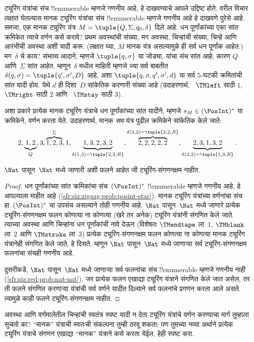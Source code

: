 \documentclass[../../../include/open-logic-section]{subfiles}
\begin{document}
\begin{explain}
ट्यूरिंग यंत्रांचा संच !!{enumerable} म्हणजे गणनीय
आहे, हे दाखवण्याचे आपले उद्दिष्ट होते. वरील विचार
लक्षात घेतल्यास मानक ट्यूरिंग यंत्रांचा संच
!!{enumerable} म्हणजे गणनीय
आहे हे दाखवणे पुरेसे आहे. समजा, एक मानक ट्यूरिंग
यंत्र $M = \tuple{Q, \Sigma, q_0, \delta}$ दिले
आहे. धन पूर्णांकांच्या एका सांत क्रमिकेत त्याचे
वर्णन कसे करावे? प्रथम अवस्थांची संख्या, मग
अवस्था, चिन्हांची संख्या, चिन्हे आणि आरंभीची
अवस्था अशी यादी करू. (लक्षात घ्या, $M$ मानक
यंत्र असल्यामुळे ही सर्व धन पूर्णांक आहेत.)
मग~$\delta$ चे काय? संभाव्य आदाने, म्हणजे
$\tuple{q,\sigma}$ या जोड्या, यांचा संच सांत आहे;
कारण $Q$ आणि~$\Sigma$ सांत आहेत. म्हणून~$\delta$
मधील माहिती म्हणजे ज्या सर्व बाबतीत
$\delta(q,\sigma) = \tuple{q', \sigma', D}$ आहे,
अशा $\tuple{q, \sigma, q', \sigma', d}$
या सर्व $5$-घटकी क्रमितांची सांत यादी होय.
येथे $d$ ही दिशा~$D$ सांकेतिक
करणारी संख्या आहे (उदाहरणार्थ,
~$\TMleft$ साठी $1$, ~$\TMright$ साठी $2$
आणि ~$\TMstay$ साठी $3$).

अशा प्रकारे प्रत्येक मानक ट्यूरिंग यंत्राचे
धन पूर्णांकांच्या सांत यादीने, म्हणजे
$s_M \in (\PosInt)^*$ या क्रमिकेने, वर्णन
करता येते. उदाहरणार्थ, मानक \emph{सम}
यंत्र पुढील क्रमिकेने सांकेतिक केले जाते:
\[
2, \underbrace{1, 2}_Q, 3, \overbrace{1, 2, 3}^\Sigma, 1, \underbrace{1, 3, 2, 3, 2}_{\delta(1,3) = \tuple{2,3,R}}, 
\overbrace{2, 2, 2, 2, 2}^{\delta(2,2) = \tuple{2,2,R}},
\underbrace{2, 3, 1, 3, 2}_{\delta(2,3) = \tuple{1,3,R}}.
\]
\end{explain}

\begin{thm}
$\Nat$ पासून~$\Nat$ मध्ये जाणारी अशी फलने
आहेत जी ट्यूरिंग-संगणनक्षम नाहीत.
\end{thm}

\begin{proof}
धन पूर्णांकांच्या सांत क्रमिकांचा संच~$(\PosInt)^*$
!!{enumerable} म्हणजे गणनीय आहे, हे आपल्याला माहीत आहे
(\cref{sfr:siz:zigzag:prob:posint-star}). मानक ट्यूरिंग
यंत्रांच्या वर्णनांचा संच हा~$(\PosInt)^*$ चा उपसंच
असल्याने तोही गणनीय आहे. $\Nat$ पासून~$\Nat$
मध्ये जाणारे प्रत्येक ट्यूरिंग-संगणनक्षम फलन कोणत्या
ना कोणत्या (खरे तर अनेक) ट्यूरिंग यंत्रांनी संगणित
केले जाते. त्याच्या अवस्था आणि चिन्हांना धन
पूर्णांकांची नावे देऊन (विशेषतः $\TMendtape$ ला~$1$,
$\TMblank$ ला~$2$ आणि $\TMstroke$ ला~$3$)
प्रत्येक ट्यूरिंग-संगणनक्षम फलन कोणत्या ना कोणत्या
मानक ट्यूरिंग यंत्रानेही संगणित केले जाते, हे
दिसते. म्हणून $\Nat$ पासून~$\Nat$ मध्ये जाणाऱ्या
सर्व ट्यूरिंग-संगणनक्षम फलनांचा संचही गणनीय आहे.

दुसरीकडे, $\Nat$ पासून~$\Nat$ मध्ये जाणाऱ्या
सर्व फलनांचा संच !!{enumerable} म्हणजे गणनीय नाही
(\cref{sfr:siz:red:prob:nat-nat}). जर प्रत्येक
फलन एखाद्या ट्यूरिंग यंत्राने संगणित केले
जात असेल, तर ती फलने संगणित करणाऱ्या यंत्रांची
सर्व वर्णने यादीत दिल्याने सर्व फलनांचे प्रगणन
करता आले असते. त्यामुळे काही फलने
ट्यूरिंग-संगणनक्षम नाहीत.
\end{proof}

\begin{prob}
  अवस्था आणि वर्णमालेतील चिन्हांची स्वतंत्र
  स्पष्ट यादी न देता ट्यूरिंग यंत्रांचे वर्णन
  करण्याचा मार्ग तुम्हाला सुचतो का? “मानक”
  यंत्राची स्वतःची संकल्पना तुम्ही ठरवू शकता;
  पण तुमच्या नव्या अर्थाने प्रत्येक ट्यूरिंग
  यंत्राचे संगणन एखाद्या “मानक” यंत्राने
  कसे करता येईल, हेही स्पष्ट करा.
\end{prob}
\end{document}
